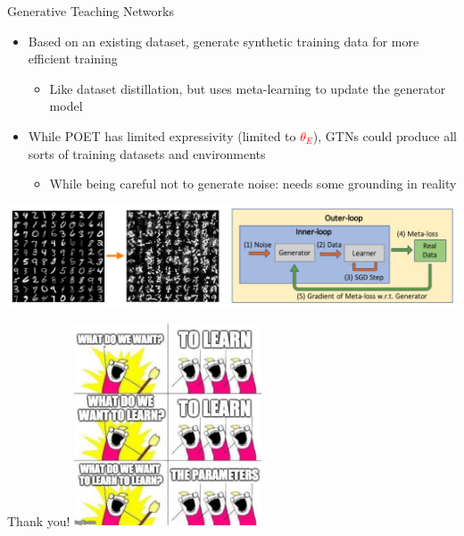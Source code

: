 \documentclass[aspectratio=169,t,handout,xcolor={usenames,dvipsnames}]{beamer}
\begin{document}
\begin{frame}{Generative Teaching Networks}
     \begin{itemize}
        \item Based on an existing dataset, generate synthetic training data for more efficient training
        \begin{itemize}
            \item Like dataset distillation, but uses meta-learning to update the generator model
        \end{itemize}
        \item While POET has limited expressivity (limited to \textcolor{red}{$\theta_E$}), GTNs could produce all sorts of training datasets and environments
        \begin{itemize}
            \item While being careful not to generate noise: needs some grounding in reality
        \end{itemize}
    \end{itemize}   
    \centering\includegraphics[height=3cm]{image/Jietu20220329-015352.jpg}
    
\end{frame}
\begin{frame}{Thank you!}
    \centering\includegraphics[height=6cm]{image/Picture6.png}
\end{frame}


\end{document}
